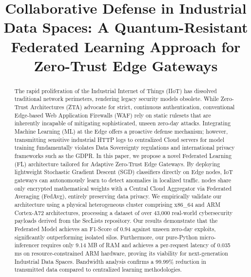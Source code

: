 \documentclass[conference]{IEEEtran}
\begin{document}
\title{Collaborative Defense in Industrial Data Spaces: A Quantum-Resistant Federated Learning Approach for Zero-Trust Edge Gateways}

\author{
}

\maketitle

\begin{abstract}
The rapid proliferation of the Industrial Internet of Things (IIoT) has dissolved traditional network perimeters, rendering legacy security models obsolete. While Zero-Trust Architectures (ZTA) advocate for strict, continuous authentication, conventional Edge-based Web Application Firewalls (WAF) rely on static rulesets that are inherently incapable of mitigating sophisticated, unseen zero-day attacks. Integrating Machine Learning (ML) at the Edge offers a proactive defense mechanism; however, transmitting sensitive industrial HTTP logs to centralized Cloud servers for model training fundamentally violates Data Sovereignty regulations and international privacy frameworks such as the GDPR. In this paper, we propose a novel Federated Learning (FL) architecture tailored for Adaptive Zero-Trust Edge Gateways. By deploying lightweight Stochastic Gradient Descent (SGD) classifiers directly on Edge nodes, IoT gateways can autonomously learn to detect anomalies in localized traffic. nodes share only encrypted mathematical weights with a Central Cloud Aggregator via Federated Averaging (FedAvg), entirely preserving data privacy. We empirically validate our architecture using a physical heterogeneous cluster comprising x86\_64 and ARM Cortex-A72 architectures, processing a dataset of over 43,000 real-world cybersecurity payloads derived from the SecLists repository. Our results demonstrate that the Federated Model achieves an F1-Score of 0.94 against unseen zero-day exploits, significantly outperforming isolated silos. Furthermore, our pure-Python micro-inferencer requires only 9.14 MB of RAM and achieves a per-request latency of 0.035 ms on resource-constrained ARM hardware, proving its viability for next-generation Industrial Data Spaces. Bandwidth analysis confirms a 99.99\% reduction in transmitted data compared to centralized learning methodologies.
\end{abstract}
\end{document}
